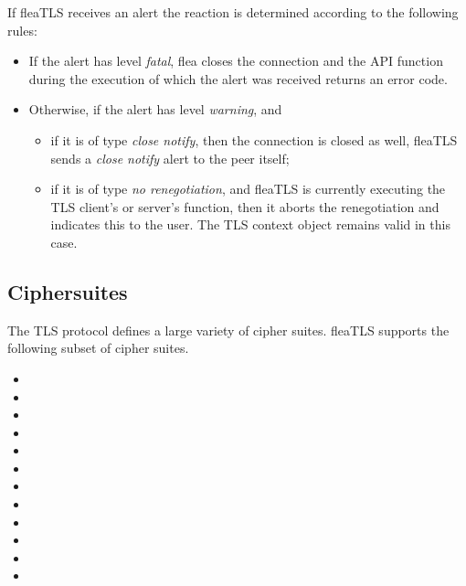 \documentclass[a4paper,11pt]{scrartcl}
\begin{document}
  If fleaTLS receives an alert the reaction is determined according to the
  following rules:
  \begin{itemize}
    \item If the alert has level \emph{fatal}, flea closes the connection and the API
        function during the execution of which the alert was received returns an
        error code.
      \item Otherwise, if the alert has level \emph{warning}, and
        \begin{itemize}
          \item if it is of type \emph{close notify}, then the connection is closed as
            well, \ie fleaTLS sends a \emph{close notify} alert to the peer itself;
          \item if it is of type \emph{no renegotiation}, and fleaTLS is
            currently executing the TLS client's or server's
             function, then it aborts the renegotiation and
            indicates this to the user. The TLS context object remains valid in
            this case.

  \end{itemize}
  \end{itemize}

\subsection{Ciphersuites}

The TLS protocol defines a large variety of cipher suites. fleaTLS
\thisFleaVersion supports the following subset of cipher suites.
\begin{itemize}
  \item {}
  \item {}
  \item {}
  \item {}
  \item {}
  \item {}
  \item {}
  \item {}
  \item {}
  \item {}
  \item {}
  \item {}
\end{itemize}
\end{document}
